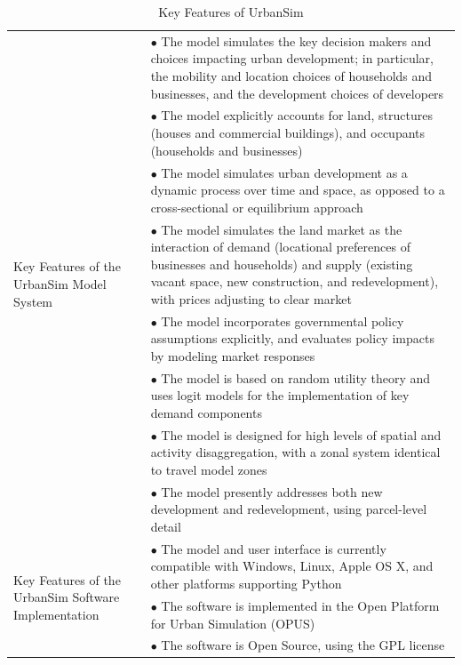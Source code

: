 \begin{table}[htp]
\caption{Key Features of UrbanSim}
\label{tab:key-features}
\begin{center}
\begin{tabular}{ p{1.5in}  p{4.4in}  }
\toprule[1.5pt]
\multirow{8}{1.5in}{Key Features of the UrbanSim
Model System} &  $\bullet$   The model simulates the key decision makers and
choices impacting urban development; in particular, the mobility and
location choices of households and businesses, and the development
choices of developers\\
&  $\bullet$   The model explicitly accounts for land, structures (houses and commercial buildings), and occupants (households and businesses)\\
&  $\bullet$   The model simulates urban development as a dynamic process over time and space, as opposed to a cross-sectional or equilibrium approach\\
&  $\bullet$   The model simulates the land market as the interaction of demand (locational preferences of businesses and households) and supply (existing vacant space, new construction, and redevelopment), with prices adjusting to clear market\\
& $\bullet$    The model incorporates governmental policy assumptions explicitly, and evaluates policy impacts by modeling market responses\\
& $\bullet$    The model is based on random utility theory and uses logit models for the implementation of key demand components\\
& $\bullet$    The model is designed for high levels of spatial and activity disaggregation, with a zonal system identical to travel model zones\\
& $\bullet$    The model presently addresses both new development and redevelopment, using parcel-level detail\\
\midrule
\multirow{8}{1,5in}{Key Features of the UrbanSim Software Implementation}
&  $\bullet$   The model and user interface is currently compatible with Windows, Linux, Apple OS X, and other platforms supporting Python\\
& $\bullet$  The software is implemented in the Open Platform for Urban Simulation (OPUS)\\
& $\bullet$  The software is Open Source, using the GPL license\\

\end{tabular}
\end{center}
\end{table}
